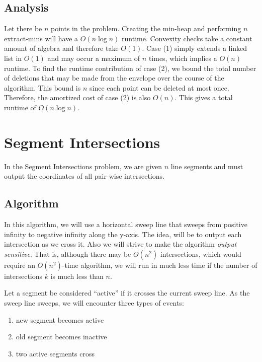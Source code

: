 \documentclass{article}
\begin{document}
\subsection{Analysis}

Let there be $n$ points in the problem.  Creating the min-heap and performing 
$n$ extract-mins will have a $O(n\log{n})$ runtime.  Convexity checks take a
constant amount of algebra and therefore take $O(1)$.  Case (1) simply 
extends a linked list in $O(1)$ and may occur a maximum of $n$ times, which
implies a $O(n)$ runtime.  To find the runtime contribution of case (2), we
bound the total number of deletions that may be made from the envelope over the
course of the algorithm.  This bound is $n$ since each point can be deleted at
most once.  Therefore, the amortized cost of case (2) is also $O(n)$. This
gives a total runtime of $O(n\log{n})$.


\section{Segment Intersections}

In the Segment Intersections problem, we are given $n$ line segments and must
output the coordinates of all pair-wise intersections.

\subsection{Algorithm}

In this algorithm, we will use a horizontal sweep line that sweeps from positive
infinity to negative infinity along the y-axis.  The idea, will be to 
output each intersection as we cross it.  Also we will strive to make the
algorithm {\em output sensitive}.  That is, although there may be $O(n^2)$
intersections, which would require an $O(n^2)$-time algorithm, we will run in
much less time if the number of intersections $k$ is much less than $n$.

Let a segment be considered ``active'' if it crosses the current sweep line.  
As the sweep line sweeps, we will encounter three types of events: 

\begin{enumerate}
    \item new segment becomes active
    \item old segment becomes inactive
    \item two active segments cross
\end{enumerate}
\end{document}
